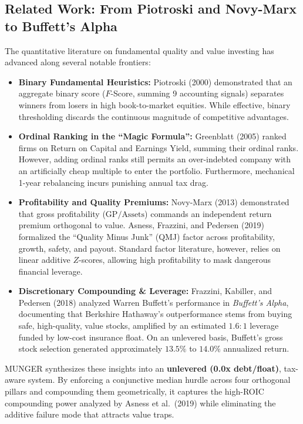 \documentclass[10pt,twocolumn]{article}
\begin{document}
\subsection{Related Work: From Piotroski and Novy-Marx to Buffett's Alpha}
The quantitative literature on fundamental quality and value investing has advanced along several notable frontiers:
\begin{itemize}
    \item \textbf{Binary Fundamental Heuristics:} Piotroski (2000) demonstrated that an aggregate binary score ($F$-Score, summing 9 accounting signals) separates winners from losers in high book-to-market equities. While effective, binary thresholding discards the continuous magnitude of competitive advantages.
    \item \textbf{Ordinal Ranking in the ``Magic Formula'':} Greenblatt (2005) ranked firms on Return on Capital and Earnings Yield, summing their ordinal ranks. However, adding ordinal ranks still permits an over-indebted company with an artificially cheap multiple to enter the portfolio. Furthermore, mechanical 1-year rebalancing incurs punishing annual tax drag.
    \item \textbf{Profitability and Quality Premiums:} Novy-Marx (2013) demonstrated that gross profitability ($\text{GP}/\text{Assets}$) commands an independent return premium orthogonal to value. Asness, Frazzini, and Pedersen (2019) formalized the ``Quality Minus Junk'' (QMJ) factor across profitability, growth, safety, and payout. Standard factor literature, however, relies on linear additive $Z$-scores, allowing high profitability to mask dangerous financial leverage.
    \item \textbf{Discretionary Compounding \& Leverage:} Frazzini, Kabiller, and Pedersen (2018) analyzed Warren Buffett's performance in \textit{Buffett's Alpha}, documenting that Berkshire Hathaway's outperformance stems from buying safe, high-quality, value stocks, amplified by an estimated $1.6:1$ leverage funded by low-cost insurance float. On an unlevered basis, Buffett's gross stock selection generated approximately $13.5\%$ to $14.0\%$ annualized return.
\end{itemize}
MUNGER synthesizes these insights into an \textbf{unlevered (0.0x debt/float)}, tax-aware system. By enforcing a conjunctive median hurdle across four orthogonal pillars and compounding them geometrically, it captures the high-ROIC compounding power analyzed by Asness et al.\ (2019) while eliminating the additive failure mode that attracts value traps.
\end{document}
